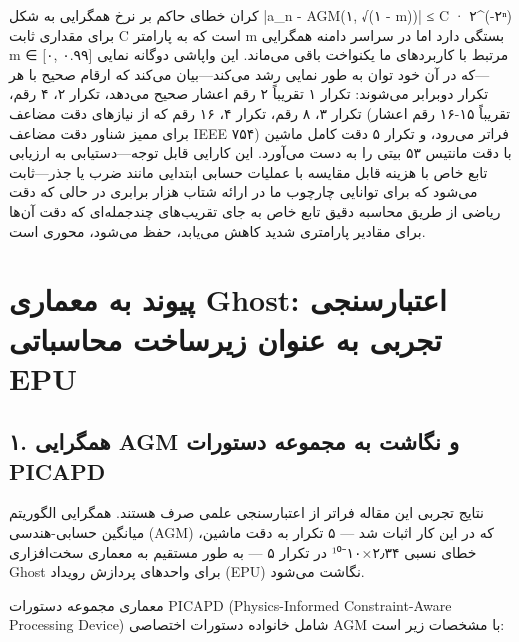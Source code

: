 \documentclass[12pt, a4paper]{article}
\begin{document}
کران خطای حاکم بر نرخ همگرایی به شکل |a\_n - AGM(۱, √(۱ - m))| ≤ C · ۲\textasciicircum{}(-۲ⁿ) برای مقداری ثابت C است که به پارامتر m بستگی دارد اما در سراسر دامنه همگرایی m ∈ [۰, ۰.۹۹] مرتبط با کاربردهای ما یکنواخت باقی می‌ماند. این واپاشی دوگانه نمایی—که در آن خود توان به طور نمایی رشد می‌کند—بیان می‌کند که ارقام صحیح با هر تکرار دوبرابر می‌شوند: تکرار ۱ تقریباً ۲ رقم اعشار صحیح می‌دهد، تکرار ۲، ۴ رقم، تکرار ۳، ۸ رقم، تکرار ۴، ۱۶ رقم که از نیازهای دقت مضاعف (تقریباً ۱۵-۱۶ رقم اعشار برای ممیز شناور دقت مضاعف IEEE ۷۵۴) فراتر می‌رود، و تکرار ۵ دقت کامل ماشین با دقت مانتیس ۵۳ بیتی را به دست می‌آورد. این کارایی قابل توجه—دستیابی به ارزیابی تابع خاص با هزینه قابل مقایسه با عملیات حسابی ابتدایی مانند ضرب یا جذر—ثابت می‌شود که برای توانایی چارچوب ما در ارائه شتاب هزار برابری در حالی که دقت ریاضی از طریق محاسبه دقیق تابع خاص به جای تقریب‌های چندجمله‌ای که دقت آن‌ها برای مقادیر پارامتری شدید کاهش می‌یابد، حفظ می‌شود، محوری است.

\section*{پیوند به معماری Ghost: اعتبارسنجی تجربی به عنوان زیرساخت محاسباتی EPU}

\subsection*{۱. همگرایی AGM و نگاشت به مجموعه دستورات PICAPD}

نتایج تجربی این مقاله فراتر از اعتبارسنجی علمی صرف هستند. همگرایی الگوریتم میانگین حسابی-هندسی (AGM) که در این کار اثبات شد — ۵ تکرار به دقت ماشین، خطای نسبی ۲٫۳۴×۱۰⁻¹⁰ در تکرار ۵ — به طور مستقیم به معماری سخت‌افزاری Ghost برای واحدهای پردازش رویداد (EPU) نگاشت می‌شود.

معماری مجموعه دستورات PICAPD (Physics-Informed Constraint-Aware Processing Device) شامل خانواده دستورات اختصاصی AGM با مشخصات زیر است:
\end{document}
